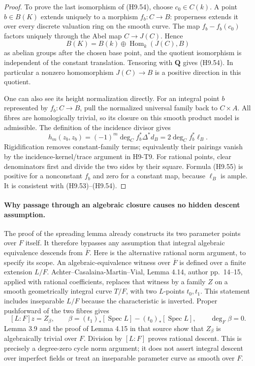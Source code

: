 \documentclass[11pt,a4paper]{article}
\begin{document}
\begin{proof}
To prove the last isomorphism of (H9.54), choose $c_0\in C(k)$.
A point $b\in B(K)$ extends uniquely to a morphism $f_b:C\to B$:
properness extends it over every discrete valuation ring on the
smooth curve. The map $f_b-f_b(c_0)$ factors uniquely through the
Abel map $C\to J(C)$. Hence
\[
 B(K)=B(k)\oplus\operatorname{Hom}_k(J(C),B)
\]
as abelian groups after the chosen base point, and the quotient
isomorphism is independent of the constant translation. Tensoring
with $\mathbf Q$ gives (H9.54). In particular a nonzero homomorphism
$J(C)\to B$ is a positive direction in this quotient.

One can also see its height normalization directly. For an integral
point $b$ represented by $f_b:C\to B$, pull the normalized universal
family back to $C\times A$. All fibres are homologically trivial,
so its closure on this smooth product model is admissible. The
definition of the incidence divisor gives
\[
 h_m(z_b,z_b)
      =(-1)^m\deg_C f_b^*\Delta^*d_B
      =2\deg_C f_b^*\ell_B.                               \tag{H9.55}
\]
Rigidification removes constant-family terms; equivalently their
pairings vanish by the incidence-kernel/trace argument in H9-T9.
For rational points, clear denominators first and divide the two
sides by their square. Formula (H9.55) is positive for a nonconstant
$f_b$ and zero for a constant map, because $\ell_B$ is ample.
It is consistent with (H9.53)--(H9.54).
\end{proof}

\paragraph{Why passage through an algebraic closure causes no hidden descent assumption.}
The proof of the spreading lemma already constructs its two parameter
points over $F$ itself. It therefore bypasses any assumption that
integral algebraic equivalence descends from $\overline F$.
Here is the alternative rational norm argument, to specify its scope.
An algebraic-equivalence witness over $\overline F$ is defined over
a finite extension $L/F$. Achter--Casalaina-Martin--Vial, Lemma 4.14,
author pp.~14--15, applied with rational coefficients, replaces that
witness by a family $Z$ on a smooth geometrically integral curve
$T/F$, with two $L$-points $t_0,t_1$. This statement includes
inseparable $L/F$ because the characteristic is inverted. Proper
pushforward of the two fibres gives
\[
 [L:F]z
  =Z_{\beta},\qquad
 \beta=(t_1)_*[\operatorname{Spec}L]
            -(t_0)_*[\operatorname{Spec}L],\qquad
 \deg_F\beta=0.
\]
Lemma 3.9 and the proof of Lemma 4.15 in that source show that
$Z_\beta$ is algebraically trivial over $F$. Division by $[L:F]$
proves rational descent. This is precisely a degree-zero cycle
norm argument; it does not assert integral descent over imperfect
fields or treat an inseparable parameter curve as smooth over $F$.
\end{document}
